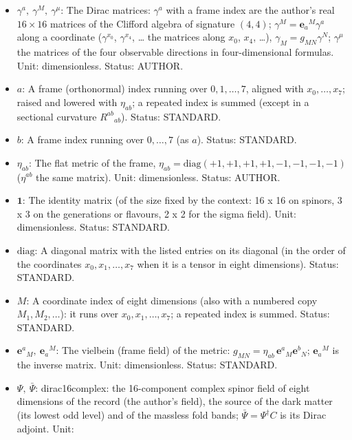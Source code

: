 \documentclass[
  10pt,
]{article}
\providecommand{\tightlist}{%
  \setlength{\itemsep}{0pt}\setlength{\parskip}{0pt}}
\begin{document}
\begin{itemize}
\tightlist
\item
  \(\gamma^a,\ \gamma^M,\ \gamma^\mu\): The Dirac matrices: \(\gamma^a\)
  with a frame index are the author's real \(16 \times 16\) matrices of
  the Clifford algebra of signature \((4, 4)\);
  \(\gamma^M = \mathbf{e}_a{}^M\gamma^a\) along a coordinate
  (\(\gamma^{x_0}\), \(\gamma^{x_4}\), \ldots{} the matrices along
  \(x_0\), \(x_4\), \ldots), \(\gamma_M = g_{MN}\gamma^N\);
  \(\gamma^\mu\) the matrices of the four observable directions in
  four-dimensional formulas. Unit: dimensionless. Status: AUTHOR.
\item
  \(a\): A frame (orthonormal) index running over \(0, 1, \dots, 7\),
  aligned with \(x_0, \dots, x_7\); raised and lowered with
  \(\eta_{ab}\); a repeated index is summed (except in a sectional
  curvature \(R^{ab}{}_{ab}\)). Status: STANDARD.
\item
  \(b\): A frame index running over \(0, \dots, 7\) (as \(a\)). Status:
  STANDARD.
\item
  \(\eta_{ab}\): The flat metric of the frame,
  \(\eta_{ab} = \mathrm{diag}(+1, +1, +1, +1, -1, -1, -1, -1)\)
  (\(\eta^{ab}\) the same matrix). Unit: dimensionless. Status: AUTHOR.
\item
  \(\mathbf{1}\): The identity matrix (of the size fixed by the context:
  16 x 16 on spinors, 3 x 3 on the generations or flavours, 2 x 2 for
  the sigma field). Unit: dimensionless. Status: STANDARD.
\item
  \(\mathrm{diag}\): A diagonal matrix with the listed entries on its
  diagonal (in the order of the coordinates \(x_0, x_1, \dots, x_7\)
  when it is a tensor in eight dimensions). Status: STANDARD.
\item
  \(M\): A coordinate index of eight dimensions (also with a numbered
  copy \(M_1, M_2, \dots\)): it runs over \(x_0, x_1, \dots, x_7\); a
  repeated index is summed. Status: STANDARD.
\item
  \(\mathbf{e}^a{}_M,\ \mathbf{e}_a{}^M\): The vielbein (frame field) of
  the metric: \(g_{MN} = \eta_{ab}\,\mathbf{e}^a{}_M\mathbf{e}^b{}_N\);
  \(\mathbf{e}_a{}^M\) is the inverse matrix. Unit: dimensionless.
  Status: STANDARD.
\item
  \(\Psi,\ \bar\Psi\): dirac16complex: the 16-component complex spinor
  field of eight dimensions of the record (the author's field), the
  source of the dark matter (its lowest odd level) and of the massless
  fold bands; \(\bar\Psi = \Psi^\dagger C\) is its Dirac adjoint. Unit:

\end{itemize}
\end{document}
